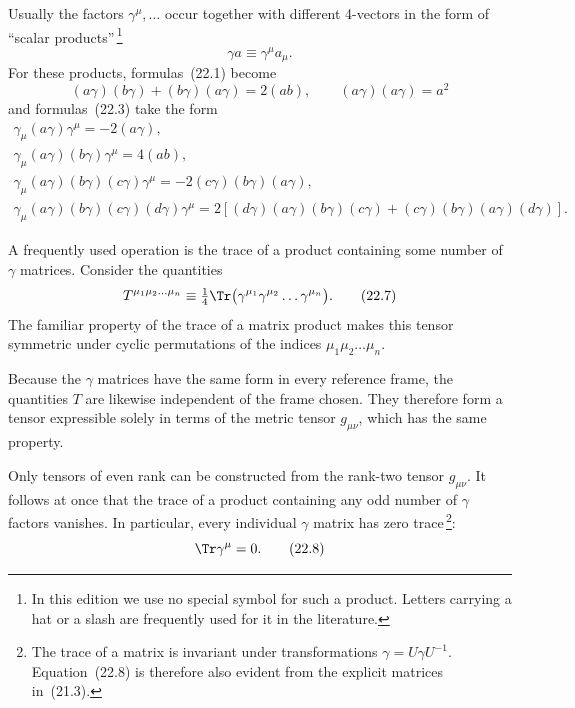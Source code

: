Usually the factors $\gamma^\mu, \ldots$ occur together with different 4-vectors in the form of ``scalar products''\,\footnote{In this edition we use no special symbol for such a product. Letters carrying a hat or a slash are frequently used for it in the literature.}
\begin{equation}
\gamma a \equiv \gamma^\mu a_\mu.
\tag{22.4}
\end{equation}
For these products, formulas~(22.1) become
\begin{equation}
(a\gamma)(b\gamma) + (b\gamma)(a\gamma) = 2(ab),\qquad (a\gamma)(a\gamma) = a^2
\tag{22.5}
\end{equation}
and formulas~(22.3) take the form
\begin{equation}
\begin{gathered}
\gamma_\mu(a\gamma)\gamma^\mu = -2(a\gamma),\\
\gamma_\mu(a\gamma)(b\gamma)\gamma^\mu = 4(ab),\\
\gamma_\mu(a\gamma)(b\gamma)(c\gamma)\gamma^\mu = -2(c\gamma)(b\gamma)(a\gamma),\\
\gamma_\mu(a\gamma)(b\gamma)(c\gamma)(d\gamma)\gamma^\mu = 2[(d\gamma)(a\gamma)(b\gamma)(c\gamma) + (c\gamma)(b\gamma)(a\gamma)(d\gamma)].
\end{gathered}
\tag{22.6}
\end{equation}

A frequently used operation is the trace of a product containing some number of $\gamma$ matrices. Consider the quantities
\begin{equation}
T^{\mu_1\mu_2\ldots\mu_n} \equiv \tfrac{1}{4}\Tr\bigl(\gamma^{\mu_1}\gamma^{\mu_2}\ldots\gamma^{\mu_n}\bigr).
\tag{22.7}
\end{equation}
The familiar property of the trace of a matrix product makes this tensor symmetric under cyclic permutations of the indices $\mu_1\mu_2\ldots\mu_n$.

Because the $\gamma$ matrices have the same form in every reference frame, the quantities $T$ are likewise independent of the frame chosen. They therefore form a tensor expressible solely in terms of the metric tensor $g_{\mu\nu}$, which has the same property.

Only tensors of even rank can be constructed from the rank-two tensor $g_{\mu\nu}$. It follows at once that the trace of a product containing any odd number of $\gamma$ factors vanishes. In particular, every individual $\gamma$ matrix has zero trace\,\footnote{The trace of a matrix is invariant under transformations $\gamma = U\gamma U^{-1}$. Equation~(22.8) is therefore also evident from the explicit matrices in~(21.3).}:
\begin{equation}
\Tr\gamma^\mu = 0.
\tag{22.8}
\end{equation}

